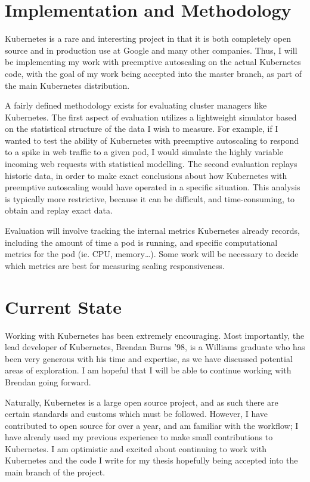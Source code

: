 \documentclass[letterpaper,11pt,twocolumn]{article}
\begin{document}
\section{Implementation and Methodology}

Kubernetes is a rare and interesting project in that it is both completely open
source and in production use at Google and many other
companies.\cite{google-container-engine} Thus, I will be implementing my work
with preemptive autoscaling on the actual Kubernetes code, with the goal of my
work being accepted into the master branch, as part of the main
Kubernetes distribution.

A fairly defined methodology exists for evaluating cluster managers like
Kubernetes.\cite[pg. 355]{omega} The first aspect of evaluation utilizes a
lightweight simulator based on the statistical structure of the data I wish to
measure. For example, if I wanted to test the ability of Kubernetes with
preemptive autoscaling to respond to a spike in web traffic to a given pod, I
would simulate the highly variable incoming web requests with statistical
modelling. The second evaluation replays historic data, in order to make exact
conclusions about how Kubernetes with preemptive autoscaling would have operated in a
specific situation. This analysis is typically more restrictive, because it can
be difficult, and time-consuming, to obtain and replay exact data.

Evaluation will involve tracking the internal metrics Kubernetes already
records, including the amount of time a pod is running, and specific
computational metrics for the pod (ie. CPU, memory\dots). Some work will be
necessary to decide which metrics are best for measuring scaling responsiveness.

\section{Current State}

Working with Kubernetes has been extremely encouraging. Most importantly,
the lead developer of Kubernetes, Brendan Burns '98, is a Williams graduate who has
been very generous with his time and expertise, as we have discussed potential
areas of exploration. I am hopeful that I will be able to continue
working with Brendan going forward.

Naturally, Kubernetes is a large open source project, and as such there are
certain standards and customs which must be followed.
However, I have contributed to open source for over a
year, and am familiar with the workflow; I have already used my previous experience to
make small contributions to Kubernetes. I am optimistic and excited about
continuing to work with Kubernetes and the code I write for my
thesis hopefully being accepted into the main branch of the project.
\end{document}
